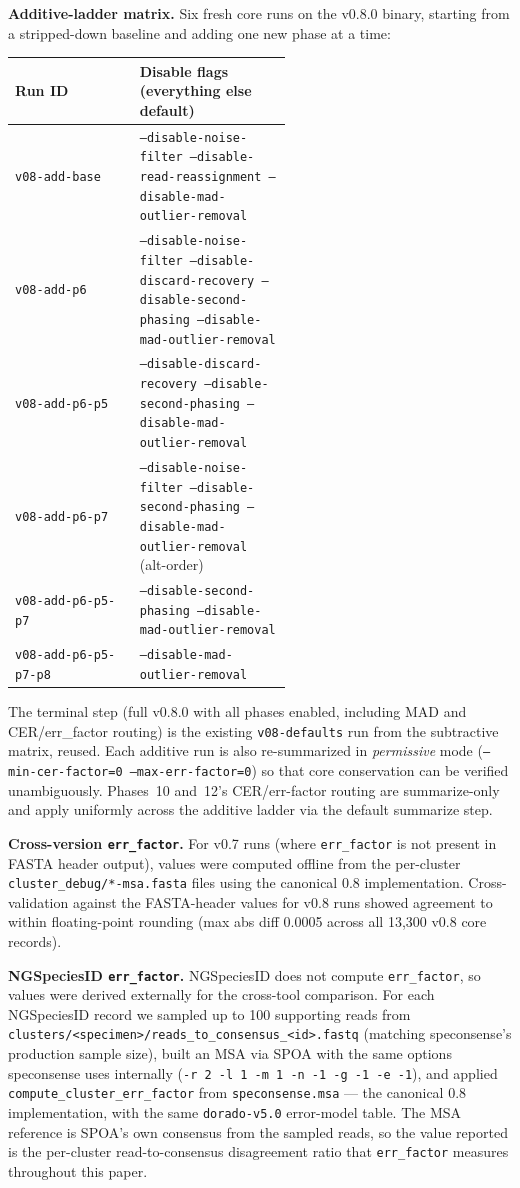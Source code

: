 \documentclass[11pt]{article}
\begin{document}
\textbf{Additive-ladder matrix.} Six fresh core runs on the v0.8.0
binary, starting from a stripped-down baseline and adding one new phase
at a time:

\begin{center}
\begin{tabular}{l p{0.55\linewidth}}
\toprule
Run ID & Disable flags (everything else default) \\
\midrule
\texttt{v08-add-base} & \texttt{--disable-noise-filter --disable-read-reassignment --disable-mad-outlier-removal} \\
\texttt{v08-add-p6} & \texttt{--disable-noise-filter --disable-discard-recovery --disable-second-phasing --disable-mad-outlier-removal} \\
\texttt{v08-add-p6-p5} & \texttt{--disable-discard-recovery --disable-second-phasing --disable-mad-outlier-removal} \\
\texttt{v08-add-p6-p7} & \texttt{--disable-noise-filter --disable-second-phasing --disable-mad-outlier-removal} (alt-order) \\
\texttt{v08-add-p6-p5-p7} & \texttt{--disable-second-phasing --disable-mad-outlier-removal} \\
\texttt{v08-add-p6-p5-p7-p8} & \texttt{--disable-mad-outlier-removal} \\
\bottomrule
\end{tabular}
\end{center}

The terminal step (full v0.8.0 with all phases enabled, including MAD
and CER/err\_factor routing) is the existing \texttt{v08-defaults} run
from the subtractive matrix, reused. Each additive run is also
re-summarized in \emph{permissive} mode (\texttt{--min-cer-factor=0
--max-err-factor=0}) so that core conservation can be verified
unambiguously. Phases~10 and~12's CER/err-factor routing are summarize-only
and apply uniformly across the additive ladder via the default
summarize step.

\textbf{Cross-version \texttt{err\_factor}.} For v0.7 runs (where
\texttt{err\_factor} is not present in FASTA header output), values were
computed offline from the per-cluster \texttt{cluster\_debug/*-msa.fasta}
files using the canonical 0.8 implementation. Cross-validation against the
FASTA-header values for v0.8 runs showed agreement to within floating-point
rounding (max abs diff 0.0005 across all 13,300 v0.8 core records).

\textbf{NGSpeciesID \texttt{err\_factor}.} NGSpeciesID does not compute
\texttt{err\_factor}, so values were derived externally for the
cross-tool comparison. For each NGSpeciesID record we sampled up to 100
supporting reads from
\texttt{clusters/<specimen>/reads\_to\_consensus\_<id>.fastq} (matching
speconsense's production sample size), built an MSA via SPOA with the
same options speconsense uses internally
(\texttt{-r 2 -l 1 -m 1 -n -1 -g -1 -e -1}), and applied
\texttt{compute\_cluster\_err\_factor} from \texttt{speconsense.msa} ---
the canonical 0.8 implementation, with the same
\texttt{dorado-v5.0} error-model table. The MSA reference is SPOA's own
consensus from the sampled reads, so the value reported is the
per-cluster read-to-consensus disagreement ratio that
\texttt{err\_factor} measures throughout this paper.
\end{document}

